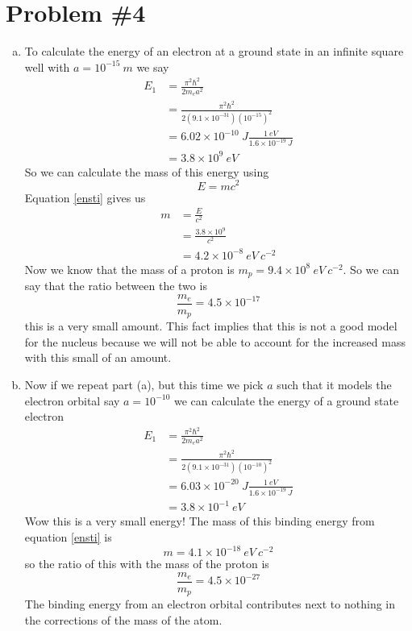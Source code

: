 \documentclass[11pt]{article}
\numberwithin{equation}{section}
\begin{document}
\section{Problem \#4}
\begin{enumerate}[(a)]
\item
To calculate the energy of an electron at a ground state in an infinite square well with $a=10^{-15}\ m$ we say
\begin{align*}
E_1 &= \frac{\pi^2\hbar^2}{2m_ea^2}\\
&= \frac{\pi^2\hbar^2}{2(9.1\times10^{-31})(10^{-15})^2}\\
&= 6.02\times10^{-10}\ J\frac{1\ eV}{1.6\times10^{-19}\ J}\\
&= 3.8\times10^9\ eV
\end{align*}
So we can calculate the mass of this energy using
\begin{equation}
E = mc^2
\label{ensti}
\end{equation}
Equation \ref{ensti} gives us
\begin{align*}
m &= \frac{E}{c^2}\\
&= \frac{3.8\times10^9}{c^2}\\
&= 4.2\times10^{-8}\ eV\ c^{-2}
\end{align*}
Now we know that the mass of a proton is $m_p = 9.4\times10^{8}\ eV\ c^{-2}$. So we can say that the ratio between the two is 
$$\frac{m_e}{m_p} = 4.5\times10^{-17}$$
this is a very small amount. This fact implies that this is not a good model for the nucleus because we will not be able to account for the increased mass with this small of an amount.

\item
Now if we repeat part (a), but this time we pick $a$ such that it models the electron orbital say $a=10^{-10}$ we can calculate the energy of a ground state electron
\begin{align*}
E_1 &= \frac{\pi^2\hbar^2}{2m_ea^2}\\
&= \frac{\pi^2\hbar^2}{2(9.1\times10^{-31})(10^{-10})^2}\\
&= 6.03\times10^{-20}\ J\frac{1\ eV}{1.6\times10^{-19}\ J}\\
&= 3.8\times10^{-1}\ eV
\end{align*}
Wow this is a very small energy! The mass of this binding energy from equation \ref{ensti} is
$$m = 4.1\times10^{-18}\ eV\ c^{-2}$$
so the ratio of this with the mass of the proton is
$$\frac{m_e}{m_p} = 4.5\times10^{-27}$$
The binding energy from an electron orbital contributes next to nothing in the corrections of the mass of the atom.
\end{enumerate}
\end{document}
